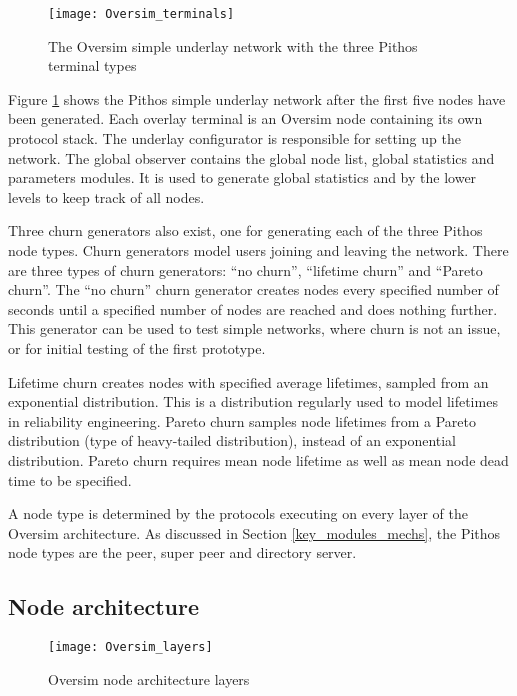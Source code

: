\begin{figure}[htbp]
 \centering
 \texttt{[image: Oversim\_terminals]}
 \caption{The Oversim simple underlay network with the three Pithos terminal types}
 \label{fig_oversim_terminals}
\end{figure}

Figure \ref{fig_oversim_terminals} shows the Pithos simple underlay network after the first five nodes have been generated. Each overlay terminal is an Oversim node containing its own protocol stack. The underlay configurator is responsible for setting up the network. The global observer contains the global node list, global statistics and parameters modules. It is used to generate global statistics and by the lower levels to keep track of all nodes.

Three churn generators also exist, one for generating each of the three Pithos node types. Churn generators model users joining and leaving the network. There are three types of churn generators: ``no churn'', ``lifetime churn'' and ``Pareto churn''. The ``no churn'' churn generator creates nodes every specified number of seconds until a specified number of nodes are reached and does nothing further. This generator can be used to test simple networks, where churn is not an issue, or for initial testing of the first prototype.

Lifetime churn creates nodes with specified average lifetimes, sampled from an exponential distribution. This is a distribution regularly used to model lifetimes in reliability engineering. Pareto churn samples node lifetimes from a Pareto distribution (type of heavy-tailed distribution), instead of an exponential distribution. Pareto churn requires mean node lifetime as well as mean node dead time to be specified.

A node type is determined by the protocols executing on every layer of the Oversim architecture. As discussed in Section \ref{key_modules_mechs}, the Pithos node types are the peer, super peer and directory server.

\subsection{Node architecture}

\begin{figure}[htbp]
 \centering
 \texttt{[image: Oversim\_layers]}
 \caption{Oversim node architecture layers}
 \label{fig_oversim_layers}
\end{figure}

